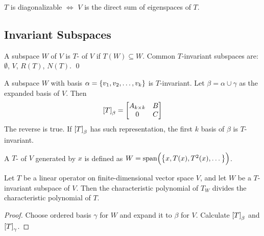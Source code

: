 \begin{theorem}
    $T$ is diagonalizable $\iff$ $V$ is the direct sum of eigenspaces of $T$.
\end{theorem}


\subsection{Invariant Subspaces}

\begin{definition}
    A subspace $W$ of $V$ is $T$- of $V$ if $T(W) \subseteq W$.
    Common $T$-invariant subspaces are: $\emptyset$, $V$, $R(T)$, $N(T)$.
    \qed
\end{definition}

\begin{theorem}
    A subspace $W$ with basis $\alpha = \set{v_1, v_2, \dots, v_k}$ is $T$-invariant. Let $\beta = \alpha \cup \gamma$ as the expanded basis of $V$. Then
    \begin{equation}
        \coordinate{T}_\beta = \begin{bmatrix}
            A_{k \times k} & B \\
            0 & C
        \end{bmatrix}
    \end{equation}
    The reverse is true. If $\coordinate{T}_\beta$  has such representation, the first $k$ basis of $\beta$ is $T$-invariant. 
\end{theorem}



\begin{definition}
    A $T$- of $V$ generated by $x$ is defined as $W=\text{span} \mleft(  \set{x, T(x), T^2(x), \dots} \mright)$.
\end{definition}

\begin{theorem}
    Let $T$ be a linear operator on finite-dimensional vector space $V$, and let $W$ be a $T$-invariant subspace of $V$. Then the characteristic polynomial of $T_W$ divides the characteristic polynomial of $T$.
\end{theorem}

\begin{proof}
    Choose ordered basis $\gamma$ for $W$ and expand it to $\beta$ for $V$. Calculate $\coordinate{T}_\beta$ and $\coordinate{T}_\gamma$.
\end{proof}


